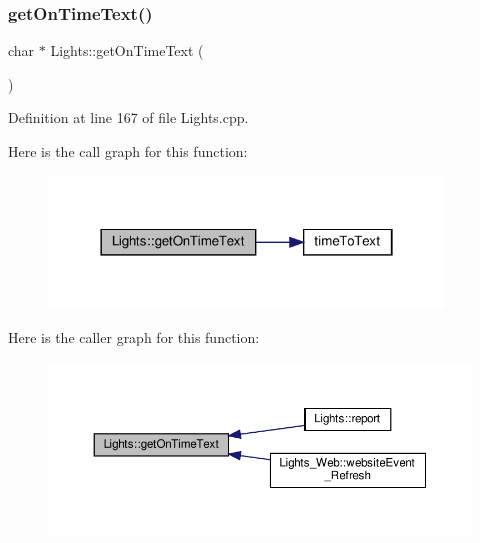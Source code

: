 \mbox{\label{class_lights_a5e2894e6935173e46c8d70f4bc7d36ed}} 
\subsubsection{\texorpdfstring{get\+On\+Time\+Text()}{getOnTimeText()}\hspace{0.1cm}{\footnotesize\ttfamily [1/2]}}
{\footnotesize\ttfamily char $\ast$ Lights\+::get\+On\+Time\+Text (\begin{DoxyParamCaption}{ }\end{DoxyParamCaption})}



Definition at line 167 of file Lights.\+cpp.

Here is the call graph for this function\+:
\nopagebreak
\begin{figure}[H]
\begin{center}
\leavevmode
\includegraphics[width=298pt]{class_lights_a5e2894e6935173e46c8d70f4bc7d36ed_cgraph}
\end{center}
\end{figure}
Here is the caller graph for this function\+:
\nopagebreak
\begin{figure}[H]
\begin{center}
\leavevmode
\includegraphics[width=350pt]{class_lights_a5e2894e6935173e46c8d70f4bc7d36ed_icgraph}
\end{center}
\end{figure}
\mbox{\label{class_lights_ae797ac0b4b64b1f0264508160bf7f5b3}} 
